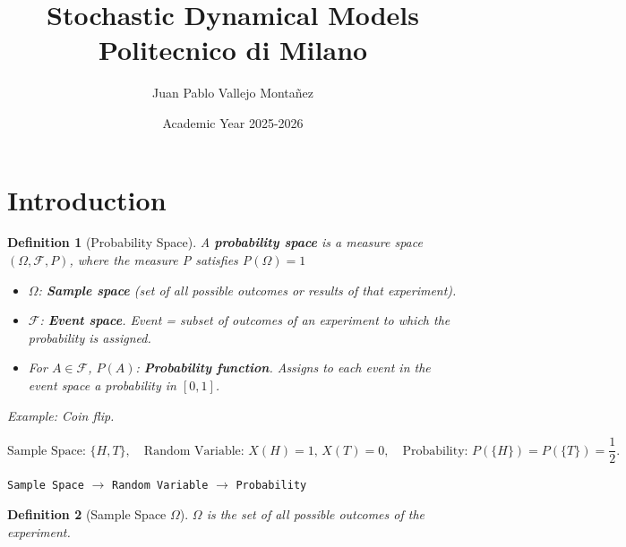 \documentclass[10pt, oneside]{article}
\title{Stochastic Dynamical Models \\ \large Politecnico di Milano}
\author{Juan Pablo Vallejo Montañez}
\date{Academic Year 2025-2026}
\newenvironment{definitionbox}[1][]{\begin{defbox}\begin{defn}[#1]}{\end{defn}\end{defbox}}
\numberwithin{equation}{section}
\newtheorem{defn}{Definition}[section]
\begin{document}
\maketitle
\tableofcontents

\vspace{.25in}

\section{Introduction}

\begin{definitionbox}[Probability Space]
    A \textbf{probability space} is a measure space \((\Omega,\mathcal{F},P)\), where the measure P satisfies P$(\Omega) = 1$
    \begin{itemize}
    \item $\Omega$: \textbf{Sample space} (set of all possible outcomes or results of that experiment).
    \item $\mathcal{F}$: \textbf{Event space}. Event = subset of outcomes of an experiment to which the probability is assigned.
    \item For $A \in \mathcal{F}$, $P(A)$: \textbf{Probability function}. Assigns to each event in the event space a probability in $[0,1]$.
\end{itemize}
\end{definitionbox}

\noindent
\textit{Example: Coin flip.}

\[
\text{Sample Space: } \{H, T\}, \quad
\text{Random Variable: } X(H)=1,\, X(T)=0, \quad
\text{Probability: } P(\{H\})=P(\{T\})=\frac{1}{2}.
\]

\begin{center}
\texttt{Sample Space} $\longrightarrow$ \texttt{Random Variable} $\longrightarrow$ \texttt{Probability}
\end{center}

\begin{definitionbox}[Sample Space $\Omega$]
$\Omega$ is the set of all possible outcomes of the experiment. 
   
\end{definitionbox}
\end{document}
